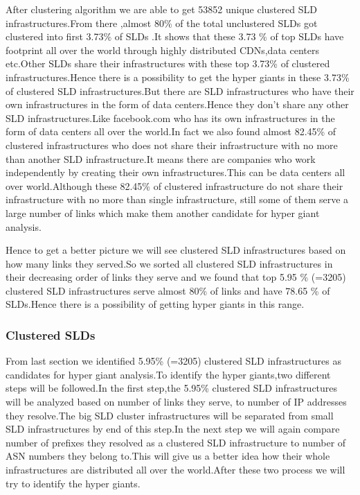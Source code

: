 After clustering algorithm we are able to get 53852 unique clustered SLD infrastructures.From there ,almost 80\% of the total unclustered SLDs got clustered into first 3.73\% of SLDs .It shows that these 3.73 \% of top SLDs have footprint all over the world through highly distributed CDNs,data centers etc.Other SLDs share their infrastructures with these top 3.73\% of clustered infrastructures.Hence there is a possibility to get the hyper giants in these 3.73\% of clustered SLD infrastructures.But there are SLD infrastructures who have their own infrastructures in the form of data centers.Hence they don't share any other SLD infrastructures.Like facebook.com who has its own infrastructures in the form of data centers all over the world.In fact we also found almost 82.45\% of clustered infrastructures who does not share their infrastructure with no more than another SLD infrastructure.It means there are companies who work independently by creating their own infrastructures.This can be data centers all over world.Although these 82.45\% of clustered infrastructure do not share their infrastructure with no more than single infrastructure, still some of them serve a large number of links which make them another candidate for hyper giant analysis.

Hence to get a better picture we will see clustered SLD infrastructures based on how many links they served.So we sorted all clustered SLD infrastructures in their decreasing order of links they serve and we found that top 5.95 \% (=3205) clustered SLD infrastructures serve almost 80\% of links and have 78.65 \% of SLDs.Hence there is a possibility of getting hyper giants in this range.

\subsubsection{Clustered SLDs}
From last section we identified 5.95\% (=3205) clustered SLD infrastructures as candidates for hyper giant analysis.To identify the hyper giants,two different steps will be followed.In the first step,the 5.95\% clustered SLD infrastructures will be analyzed based on number of links they serve, to number of IP addresses they resolve.The big SLD cluster infrastructures will be separated from small SLD infrastructures by end of this step.In the next step we will again compare number of prefixes they resolved as a clustered SLD infrastructure to number of ASN numbers they belong to.This will give us a better idea how their whole infrastructures are distributed all over the world.After these two process we will try to identify the hyper giants.

